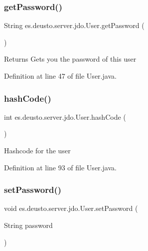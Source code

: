 \subsubsection{\texorpdfstring{get\+Password()}{getPassword()}}
{\footnotesize\ttfamily String es.\+deusto.\+server.\+jdo.\+User.\+get\+Password (\begin{DoxyParamCaption}{ }\end{DoxyParamCaption})}

\begin{DoxyReturn}{Returns}
Gets you the password of this user 
\end{DoxyReturn}


Definition at line 47 of file User.\+java.

\mbox{\label{classes_1_1deusto_1_1server_1_1jdo_1_1_user_aeabfaac22221c47ca92d8a60376c742c}} 
\subsubsection{\texorpdfstring{hash\+Code()}{hashCode()}}
{\footnotesize\ttfamily int es.\+deusto.\+server.\+jdo.\+User.\+hash\+Code (\begin{DoxyParamCaption}{ }\end{DoxyParamCaption})}

Hashcode for the user 

Definition at line 93 of file User.\+java.

\mbox{\label{classes_1_1deusto_1_1server_1_1jdo_1_1_user_a2e052b5a7cab949f61580edf44bbd233}} 
\subsubsection{\texorpdfstring{set\+Password()}{setPassword()}}
{\footnotesize\ttfamily void es.\+deusto.\+server.\+jdo.\+User.\+set\+Password (\begin{DoxyParamCaption}\item[{String}]{password }\end{DoxyParamCaption})}


